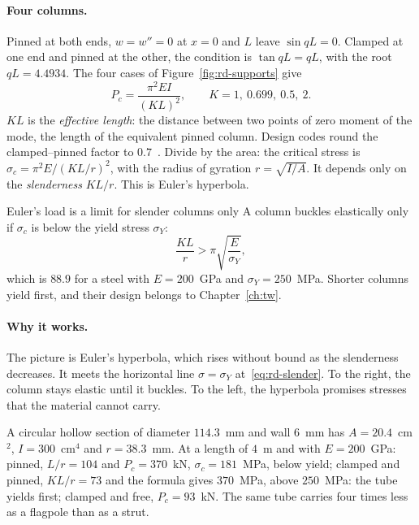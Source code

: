 \paragraph{Four columns.}
%
Pinned at both ends, $w = w'' = 0$ at $x = 0$ and $L$ leave $\sin qL = 0$. Clamped at one end
and pinned at the other, the condition is $\tan qL = qL$, with the root $qL = 4.4934$. The
four cases of Figure~\ref{fig:rd-supports} give
\begin{equation}\label{eq:rd-euler-loads}
  P_c = \frac{\pi^2EI}{(KL)^2},
  \qquad
  K = 1,\ 0.699,\ 0.5,\ 2 .
\end{equation}
$KL$ is the \emph{effective length}: the distance between two points of zero moment of the
mode, the length of the equivalent pinned column. Design codes round the clamped--pinned
factor to $0.7$~\cite[Section~13.3]{rd-hibbeler2014}. Divide by the area: the critical stress
is $\sigma_c = \pi^2E/(KL/r)^2$, with the radius of gyration $r = \sqrt{I/A}$. It depends only on
the \emph{slenderness} $KL/r$. This is Euler's hyperbola.

\begin{gbox}{Euler's load is a limit for slender columns only}\label{sec:rd-slender}
%
A column buckles elastically only if $\sigma_c$ is below the yield stress $\sigma_Y$:
\begin{equation}\label{eq:rd-slender}
  \frac{KL}{r} > \pi\sqrt{\frac{E}{\sigma_Y}} ,
\end{equation}
which is $88.9$ for a steel with $E = 200$~GPa and $\sigma_Y = 250$~MPa. Shorter columns
yield first, and their design belongs to Chapter~\ref{ch:tw}.
\end{gbox}

\paragraph{Why it works.}
The picture is Euler's hyperbola, which rises without bound as the slenderness decreases.
It meets the horizontal line $\sigma = \sigma_Y$ at~\eqref{eq:rd-slender}. To the right, the
column stays elastic until it buckles. To the left, the hyperbola promises stresses that
the material cannot carry.

\begin{example}\label{ex:rd-tube}
A circular hollow section of diameter $114.3$~mm and wall $6$~mm has $A = 20.4$~cm$^2$,
$I = 300$~cm$^4$ and $r = 38.3$~mm. At a length of $4$~m and with $E = 200$~GPa:
pinned, $L/r = 104$ and $P_c = 370$~kN, $\sigma_c = 181$~MPa, below yield; clamped and pinned,
$KL/r = 73$ and the formula gives $370$~MPa, above $250$~MPa: the tube yields first; clamped and
free, $P_c = 93$~kN. The same tube carries four times less as a flagpole than as a strut.
\end{example}

